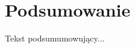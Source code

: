 \documentclass[../main.tex]{subfiles}
\begin{document}
\section{Podsumowanie}
Tekst podsumumowujący...
\end{document}

